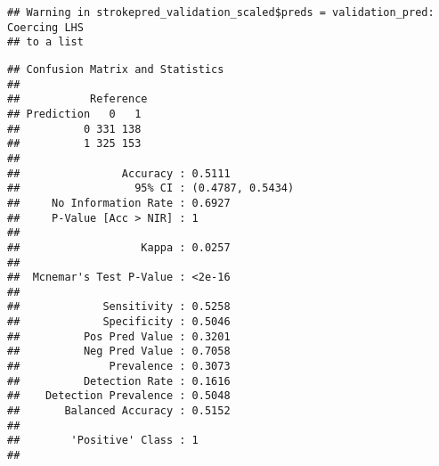 \documentclass[
]{article}
\newenvironment{Shaded}{\begin{snugshade}}{\end{snugshade}}
\newcommand{\AttributeTok}[1]{\textcolor[rgb]{0.13,0.29,0.53}{#1}}
\newcommand{\CommentTok}[1]{\textcolor[rgb]{0.56,0.35,0.01}{\textit{#1}}}
\newcommand{\DecValTok}[1]{\textcolor[rgb]{0.00,0.00,0.81}{#1}}
\newcommand{\FunctionTok}[1]{\textcolor[rgb]{0.13,0.29,0.53}{\textbf{#1}}}
\newcommand{\NormalTok}[1]{#1}
\newcommand{\OtherTok}[1]{\textcolor[rgb]{0.56,0.35,0.01}{#1}}
\newcommand{\SpecialCharTok}[1]{\textcolor[rgb]{0.81,0.36,0.00}{\textbf{#1}}}
\newcommand{\StringTok}[1]{\textcolor[rgb]{0.31,0.60,0.02}{#1}}
\begin{document}
\begin{verbatim}
## Warning in strokepred_validation_scaled$preds = validation_pred: Coercing LHS
## to a list
\end{verbatim}

\begin{Shaded}
\end{Shaded}

\begin{verbatim}
## Confusion Matrix and Statistics
## 
##           Reference
## Prediction   0   1
##          0 331 138
##          1 325 153
##                                           
##                Accuracy : 0.5111          
##                  95% CI : (0.4787, 0.5434)
##     No Information Rate : 0.6927          
##     P-Value [Acc > NIR] : 1               
##                                           
##                   Kappa : 0.0257          
##                                           
##  Mcnemar's Test P-Value : <2e-16          
##                                           
##             Sensitivity : 0.5258          
##             Specificity : 0.5046          
##          Pos Pred Value : 0.3201          
##          Neg Pred Value : 0.7058          
##              Prevalence : 0.3073          
##          Detection Rate : 0.1616          
##    Detection Prevalence : 0.5048          
##       Balanced Accuracy : 0.5152          
##                                           
##        'Positive' Class : 1               
## 
\end{verbatim}
\end{document}
